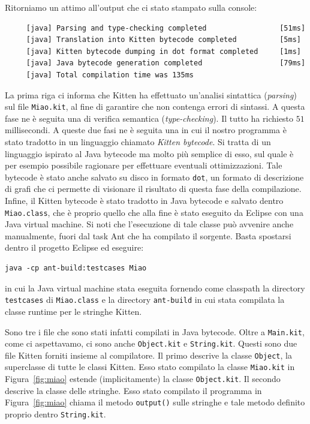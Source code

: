 Ritorniamo un attimo all'output che ci \e stato stampato sulla console:
%
\begin{verbatim}
     [java] Parsing and type-checking completed                 [51ms]
     [java] Translation into Kitten bytecode completed          [5ms]
     [java] Kitten bytecode dumping in dot format completed     [1ms]
     [java] Java bytecode generation completed                  [79ms]
     [java] Total compilation time was 135ms
\end{verbatim}
%
La prima riga ci informa che Kitten ha effettuato un'analisi sintattica
(\emph{parsing}) sul file \texttt{Miao.kit}, al fine di garantire che non
contenga errori di sintassi. A questa fase ne \`e seguita una di verifica
semantica (\emph{type-checking}). Il tutto ha richiesto $51$ millisecondi.
A queste due fasi ne \`e seguita una in cui il nostro programma \`e
stato tradotto in un linguaggio chiamato \emph{Kitten bytecode}. Si tratta
di un linguaggio ispirato al Java bytecode ma molto pi\`u semplice di esso,
sul quale \`e per esempio possibile
ragionare per effettuare eventuali ottimizzazioni. Tale bytecode \`e
stato anche salvato su disco in formato \texttt{dot}, un
formato di descrizione di grafi che ci permette di visionare il risultato
di questa fase della compilazione. Infine, il Kitten bytecode \`e stato
tradotto in Java bytecode e salvato dentro \texttt{Miao.class},
che \`e proprio quello che alla fine \`e stato eseguito da Eclipse
con una Java virtual machine. Si noti che l'esecuzione di tale classe
pu\`o avvenire anche manualmente, fuori dal task Ant che ha compilato
il sorgente. Basta spostarsi dentro il progetto Eclipse ed eseguire:
%
\begin{verbatim}
java -cp ant-build:testcases Miao
\end{verbatim}
%
in cui la Java virtual machine \e stata eseguita fornendo come classpath
la directory \texttt{testcases} di \texttt{Miao.class} e la directory
\texttt{ant-build} in cui \e stata compilata la classe runtime
per le stringhe Kitten.

Sono tre i file che sono stati infatti compilati in Java
bytecode. Oltre a \texttt{Main.kit}, come ci aspettavamo, ci sono anche
\texttt{Object.kit} e \texttt{String.kit}. Questi sono due file Kitten
forniti insieme al compilatore. Il primo descrive la
classe \texttt{Object}, \cioe la superclasse di tutte le classi
Kitten. Esso \e stato compilato \poiche la classe \texttt{Miao.kit}
in Figura~\ref{fig:miao} estende (implicitamente) la classe
\texttt{Object.kit}. Il secondo descrive la classe delle stringhe.
Esso \e stato compilato \poiche il programma in Figura~\ref{fig:miao}
chiama il metodo \texttt{output()} sulle stringhe e tale metodo \e
definito proprio dentro \texttt{String.kit}.

